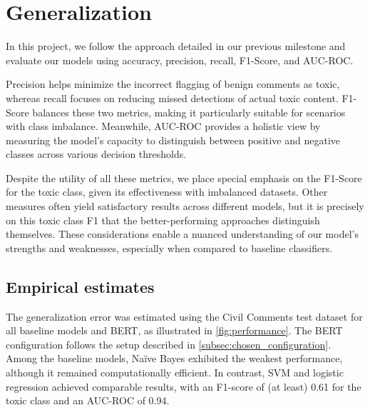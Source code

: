 \section{Generalization}\label{sec:generalization}

In this project, we follow the approach detailed in our previous milestone and evaluate our models using accuracy, precision, recall, F1-Score, and AUC-ROC. \cite{Ammar2024}

Precision helps minimize the incorrect flagging of benign comments as toxic, whereas recall focuses on reducing missed detections of actual toxic content. F1-Score balances these two metrics, making it particularly suitable for scenarios with class imbalance. Meanwhile, AUC-ROC provides a holistic view by measuring the model’s capacity to distinguish between positive and negative classes across various decision thresholds.

Despite the utility of all these metrics, we place special emphasis on the F1-Score for the toxic class, given its effectiveness with imbalanced datasets. Other measures often yield satisfactory results across different models, but it is precisely on this toxic class F1 that the better-performing approaches distinguish themselves. These considerations enable a nuanced understanding of our model's strengths and weaknesses, especially when compared to baseline classifiers.

\subsection{Empirical estimates}
The generalization error was estimated using the Civil Comments test dataset for all baseline models and BERT, as illustrated in \cref{fig:performance}. The BERT configuration follows the setup described in \cref{subsec:chosen_configuration}. Among the baseline models, Naïve Bayes exhibited the weakest performance, although it remained computationally efficient. In contrast, SVM and logistic regression achieved comparable results, with an F1-score of (at least) 0.61 for the toxic class and an AUC-ROC of 0.94. 

